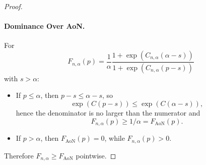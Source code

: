 \documentclass{article}
\theoremstyle{plain}
\theoremstyle{definition}
\theoremstyle{remark}
\begin{document}
\begin{proof}
\paragraph{Dominance Over AoN.}

For
\[
F_{n,\alpha}(p) = \frac{1}{\alpha} \frac{1 + \exp(C_{n,\alpha}(\alpha - s))}{1 + \exp(C_{n,\alpha}(p - s))}
\]
with $s > \alpha$:
\begin{itemize}
    \item If $p \le \alpha$, then $p - s \le \alpha - s$, so
    \[
    \exp(C(p - s)) \le \exp(C(\alpha - s)),
    \]
    hence the denominator is no larger than the numerator and
    \[
    F_{n,\alpha}(p) \ge 1/\alpha = F_{\text{AoN}}(p).
    \]
    \item If $p > \alpha$, then $F_{\text{AoN}}(p) = 0$, while $F_{n,\alpha}(p) > 0$.
\end{itemize}
Therefore $F_{n,\alpha} \ge F_{\text{AoN}}$ pointwise.

\end{proof}




\end{document}
